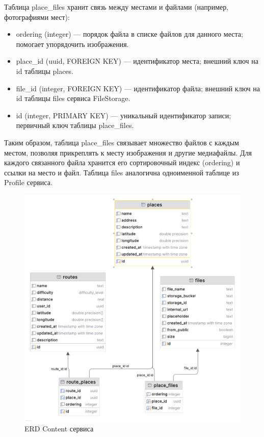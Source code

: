 Таблица place\_files хранит связь между местами и файлами (например, фотографиями мест):
\begin{itemize}
    \item ordering (integer) — порядок файла в списке файлов для данного места; помогает упорядочить изображения.
    \item place\_id (uuid, FOREIGN KEY) — идентификатор места; внешний ключ на id таблицы places.
    \item file\_id (integer, FOREIGN KEY) — идентификатор файла; внешний ключ на id таблицы files сервиса FileStorage.
    \item id (integer, PRIMARY KEY) — уникальный идентификатор записи; первичный ключ таблицы place\_files.
\end{itemize}
\noindent Таким образом, таблица place\_files связывает множество файлов с каждым местом, позволяя прикреплять к месту изображения и другие медиафайлы. Для каждого связанного файла хранится его сортировочный индекс (ordering) и ссылки на место и файл.
Таблица files аналогична одноименной таблице из Profile сервиса.
\begin{figure}[H]
        \centering
        \includegraphics[width=0.8\linewidth]{Images/second_chapter_backend_architecture/Picture12.png}
        \caption{ERD Content сервиса}
        \label{fig:content-service-erd}
\end{figure}

